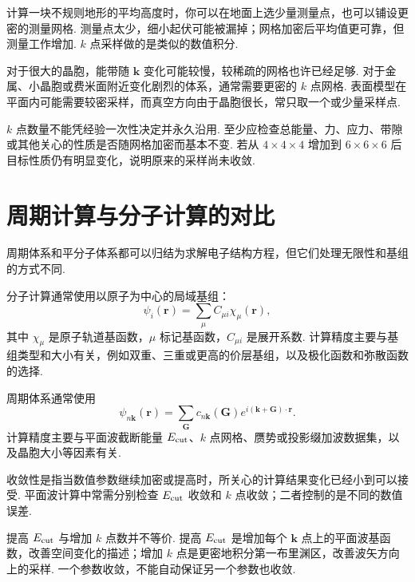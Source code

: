 \documentclass[UTF8,11pt,a4paper,openany]{ctexbook}
\begin{document}
\begin{analogybox}
计算一块不规则地形的平均高度时，你可以在地面上选少量测量点，也可以铺设更密的测量网格. 测量点太少，细小起伏可能被漏掉；网格加密后平均值更可靠，但测量工作增加. $k$ 点采样做的是类似的数值积分. 
\end{analogybox}

对于很大的晶胞，能带随 $\mathbf k$ 变化可能较慢，较稀疏的网格也许已经足够. 对于金属、小晶胞或费米面附近变化剧烈的体系，通常需要更密的 $k$ 点网格. 表面模型在平面内可能需要较密采样，而真空方向由于晶胞很长，常只取一个或少量采样点. 

\begin{limitbox}
$k$ 点数量不能凭经验一次性决定并永久沿用. 至少应检查总能量、力、应力、带隙或其他关心的性质是否随网格加密而基本不变. 若从 $4\times4\times4$ 增加到 $6\times6\times6$ 后目标性质仍有明显变化，说明原来的采样尚未收敛. 
\end{limitbox}

\section{周期计算与分子计算的对比}

周期体系和平分子体系都可以归结为求解电子结构方程，但它们处理无限性和基组的方式不同. 

分子计算通常使用以原子为中心的局域基组：
\[
\psi_i(\mathbf r)
=
\sum_\mu C_{\mu i}\chi_\mu(\mathbf r),
\]
其中 $\chi_\mu$ 是原子轨道基函数，$\mu$ 标记基函数，$C_{\mu i}$ 是展开系数. 计算精度主要与基组类型和大小有关，例如双重、三重或更高的价层基组，以及极化函数和弥散函数的选择. 

周期体系通常使用
\[
\psi_{n\mathbf k}(\mathbf r)
=
\sum_{\mathbf G}
c_{n\mathbf k}(\mathbf G)
e^{i(\mathbf k+\mathbf G)\cdot\mathbf r}.
\]
计算精度主要与平面波截断能量 $E_{\rm cut}$、$k$ 点网格、赝势或投影缀加波数据集，以及晶胞大小等因素有关. 

\begin{definitionbox}
收敛性是指当数值参数继续加密或提高时，所关心的计算结果变化已经小到可以接受. 平面波计算中常需分别检查 $E_{\rm cut}$ 收敛和 $k$ 点收敛；二者控制的是不同的数值误差. 
\end{definitionbox}

\begin{limitbox}
提高 $E_{\rm cut}$ 与增加 $k$ 点数并不等价. 提高 $E_{\rm cut}$ 是增加每个 $\mathbf k$ 点上的平面波基函数，改善空间变化的描述；增加 $k$ 点是更密地积分第一布里渊区，改善波矢方向上的采样. 一个参数收敛，不能自动保证另一个参数也收敛. 
\end{limitbox}
\end{document}

